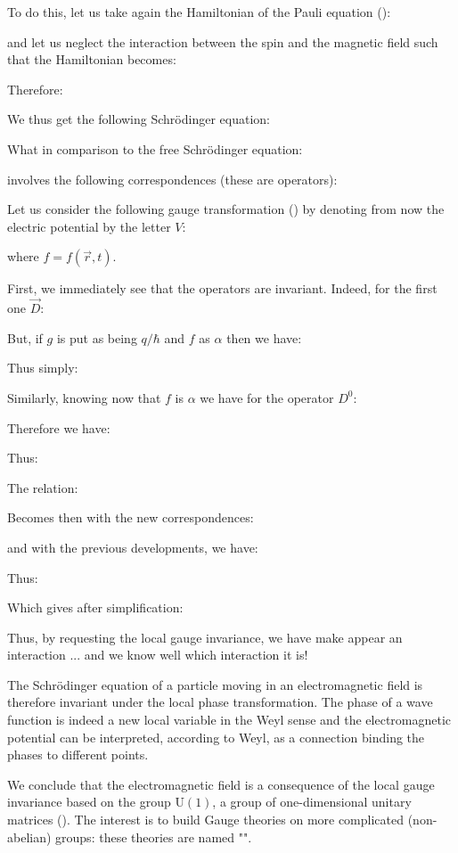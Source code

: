 	To do this, let us take again the Hamiltonian of the Pauli equation ():
	
	and let us neglect the interaction between the spin and the magnetic field such that the Hamiltonian becomes:
	
	Therefore:
	
	We thus get the following Schrödinger equation:
	
	What in comparison to the free Schrödinger equation:
	
	involves the following correspondences (these are operators):
	
	Let us consider the following gauge transformation () by denoting from now the electric potential by the letter $V$:
	
	where $f=f(\vec{r},t)$.
	
	First, we immediately see that the operators are invariant. Indeed, for the first one $\vec{D}$:
	
	But, if $g$ is put as being $q/\hbar$ and $f$ as $\alpha$ then we have:
	
	Thus simply:
	
	Similarly, knowing now that $f$ is $\alpha$ we have for the operator $D^0$:
	
	Therefore we have:
	
	Thus:
	
	The relation:
	
	Becomes then with the new correspondences:
	
	and with the previous developments, we have:
	
	Thus:
	
	Which gives after simplification:
	
	Thus, by requesting the local gauge invariance, we have make appear an interaction ... and we know well which interaction it is!

	The Schrödinger equation of a particle moving in an electromagnetic field is therefore invariant under the local phase transformation. The phase of a wave function is indeed a new local variable in the Weyl sense and the electromagnetic potential can be interpreted, according to Weyl, as a connection binding the phases to different points.

	We conclude that the electromagnetic field is a consequence of the local gauge invariance based on the group $\text{U}(1)$, a group of one-dimensional unitary matrices (). The interest is to build Gauge theories on more complicated (non-abelian) groups: these theories are named "".
	
